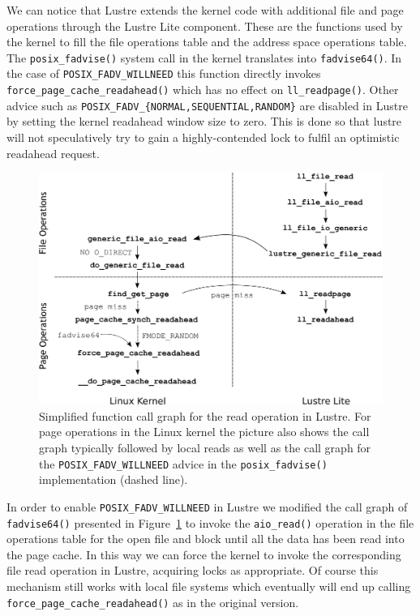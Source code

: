 We can notice that Lustre extends the kernel code with additional file and page operations through the Lustre Lite component. These are the functions used by the kernel to fill the file operations table and the address space operations table. The 
\texttt{posix\_fadvise()} system call in the kernel translates into \texttt{fadvise64()}. In the case of \texttt{POSIX\_FADV\_WILLNEED} this function directly invokes \texttt{force\_page\_cache\_readahead()} which has no effect on \texttt{ll\_readpage()}. 
Other advice such as \texttt{POSIX\_FADV\_\{NORMAL,SEQUENTIAL,RANDOM\}} are disabled in Lustre by setting the kernel readahead window size to zero. This is done so that lustre will not speculatively try to gain a highly-contended lock to fulfil an optimistic 
readahead request.

\begin{figure}[!htb]
  \centering
  \includegraphics[width=\textwidth]{figures/linux_lustre}
  \caption{Simplified function call graph for the read operation in Lustre. For page operations in the Linux kernel the picture also shows the call graph typically followed by local reads as well as the call graph for the 
  \texttt{POSIX\_FADV\_WILLNEED} advice in the \texttt{posix\_fadvise()} implementation (dashed line).}
  \label{figure: kernel}
\end{figure}

In order to enable \texttt{POSIX\_FADV\_WILLNEED} in Lustre we modified the call graph of \texttt{fadvise64()} presented in Figure~\ref{figure: kernel} to invoke the \texttt{aio\_read()} operation in the file operations table for the open file and block 
until all the data has been read into the page cache. In this way we can force the kernel to invoke the corresponding file read operation in Lustre, acquiring locks as appropriate. Of course this mechanism still works with local file systems which eventually 
will end up calling \texttt{force\_page\_cache\_readahead()} as in the original version.

